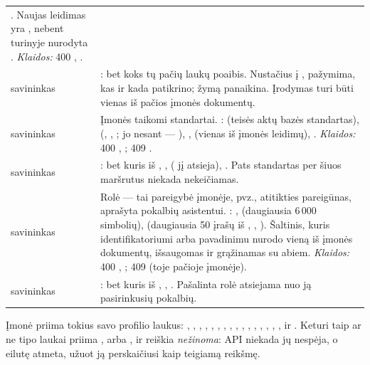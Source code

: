 \begin{xltabular}{\textwidth}{@{}L{19mm}Y@{}}
  . Naujas leidimas yra , nebent turinyje nurodyta
  . \emph{Klaidos:} 400 , . \\
\addlinespace
{}
savininkas & : bet koks tų pačių laukų poaibis. Nustačius  į
  , pažymima, kas ir kada patikrino;  žymą panaikina. Įrodymas turi
  būti vienas iš pačios įmonės dokumentų. \\
\addlinespace
{}
savininkas & Įmonės taikomi standartai. :  (teisės aktų bazės
  standartas),  (, , ; jo nesant
  --- ), ,  (vienas iš įmonės leidimų),
  . \emph{Klaidos:} 400 , ; 409
  . \\
\addlinespace
{}
savininkas & : bet kuris iš , , 
  ( jį atsieja), . Pats standartas per šiuos maršrutus niekada nekeičiamas. \\
\addlinespace
{}
savininkas & Rolė --- tai pareigybė įmonėje, pvz., atitikties pareigūnas, aprašyta pokalbių
  asistentui. : ,  (daugiausia 6\,000 simbolių),
   (daugiausia 50 įrašų iš , , ).
  Šaltinis, kuris identifikatoriumi arba pavadinimu nurodo vieną iš įmonės dokumentų,
  išsaugomas ir grąžinamas su abiem.
  \emph{Klaidos:} 400 , ; 409 
  (toje pačioje įmonėje). \\
\addlinespace
{}
savininkas & : bet kuris iš , , . Pašalinta
  rolė atsiejama nuo ją pasirinkusių pokalbių. \\
\end{xltabular}

Įmonė priima tokius savo profilio laukus: , , ,
, , , , ,
, , , ,
, , ,
,  ir . Keturi taip ar ne tipo laukai
priima ,  arba , ir  reiškia \emph{nežinoma}: API
niekada jų nespėja, o eilutę  atmeta, užuot ją perskaičiusi kaip teigiamą reikšmę.

